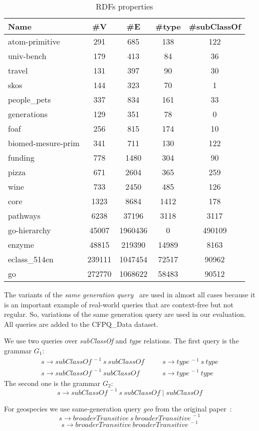 {\setlength{\tabcolsep}{0.4em}
	\begin{table}[h]
		\caption{RDFs properties}
		\label{tbl:propRDF}
		\begin{tabular}{| l | c | c | c | c |}
			\hline
			Name                  & \#V    & \#E     & \#type &\#subClassOf \\
			\hline
			\hline
			atom-primitive				& 291		& 685		& 138	& 122	\\
			univ-bench					& 179		& 413		& 84		& 36		\\
			travel						& 131		& 397		& 90		& 30		\\
			skos							& 144		& 323		& 70		& 1		\\
			people\_pets					& 337		& 834		& 161	& 33		\\
			generations					& 129		& 351		& 78		& 0		\\
			foaf							& 256		& 815		& 174	& 10		\\
			biomed-mesure-prim   	    & 341		& 711		& 130	& 122	\\
			funding						& 778		& 1480		& 304	& 90               \\
			pizza						& 671		& 2604		& 365	& 259              \\
			wine							& 733		& 2450		& 485	& 126              \\
			core							& 1323		& 8684		& 1412	& 178              \\
			pathways						& 6238		& 37196		& 3118 	& 3117             \\
			go-hierarchy					& 45007		& 1960436	& 0		& 490109           \\
			enzyme						& 48815		& 219390		& 14989	& 8163             \\
			eclass\_514en				& 239111		& 1047454	& 72517	& 90962            \\
			go							& 272770		& 1068622	& 58483	& 90512            \\
			\hline
		\end{tabular}
	\end{table}
}


The variants of the \textit{same generation query}~\cite{FndDB} are used in almost all cases because it is an important example of real-world queries that are context-free but not regular.
So, variations of the same generation query are used in our evaluation.
All queries are added to the CFPQ\_Data dataset.

We use two queries over \textit{subClassOf} and \textit{type} relations.
The first query is the grammar $G_1$:
\[
 \begin{array}{lcl}
   s  \rightarrow \textit{subClassOf}^{\ -1} \ s \ \textit{subClassOf}   & \quad & s  \rightarrow \textit{type}^{\ -1} \ s \ \textit{type}     \\
   s  \rightarrow \textit{subClassOf}^{\ -1} \ \textit{subClassOf}       & \quad & s  \rightarrow  \textit{type}^{\ -1}  \ \textit{type}

 \end{array}
 \]
The second one is the grammar $G_2$: \[s \rightarrow \textit{subClassOf}^{\ -1} \ s \ \textit{subClassOf} \mid  \textit{subClassOf}\]

For geospecies we use same-generation query \textit{geo} from the original paper~\cite{Kuijpers:2019:ESC:3335783.3335791}: \[s \rightarrow \textit{broaderTransitive} \ s \ \textit{broaderTransitive}^{\ -1} \]
\[s \rightarrow \textit{broaderTransitive}  \ \textit{broaderTransitive}^{\ -1} \]


